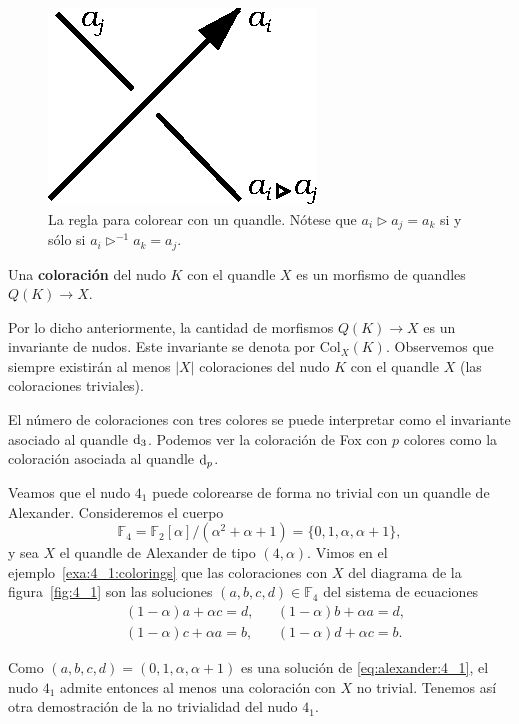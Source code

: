 \documentclass[graybox]{svmult}
\newcommand{\F}{\mathbb{F}}
\begin{document}
    \begin{figure}[h]
		\centering
	    \includegraphics[scale=0.6]{images/quandlecrossing}
		\caption{La regla para colorear con un quandle. Nótese que $a_i\triangleright a_j=a_k$ si y sólo si $a_i\triangleright^{-1}a_k=a_j$.}
        \label{fig:quandle_crossing}
    \end{figure}

	\begin{definition}
		Una \textbf{coloración} del nudo $K$ con el quandle $X$ es un morfismo
		de quandles $Q(K)\to X$. 
	\end{definition}

	Por lo dicho anteriormente, la cantidad de
    morfismos $Q(K)\to X$ es un invariante de nudos.  Este invariante se denota
    por $\mathrm{Col}_X(K)$.  Observemos que siempre existirán al menos $|X|$
    coloraciones del nudo $K$ con el quandle $X$ (las coloraciones triviales).

\begin{example}
    El número de coloraciones con tres colores se puede interpretar como 
    el invariante asociado al
    quandle $\mathrm{d}_3$. Podemos ver la coloración de Fox con $p$ colores 
    como la coloración asociada al quandle $\mathrm{d}_p$. 
\end{example}

\begin{example}
    \label{exa:T}
    Veamos que el nudo $4_1$ puede colorearse de forma no trivial con un
    quandle de Alexander.  Consideremos el cuerpo
    \[
        \F_4=\F_2[\alpha]/(\alpha^2+\alpha+1)=\{0,1,\alpha,\alpha+1\},
    \]
    y sea $X$ el quandle de Alexander de tipo $(4,\alpha)$. Vimos en el
    ejemplo~\ref{exa:4_1:colorings} que las coloraciones con $X$ del diagrama de la
    figura~\ref{fig:4_1} son las soluciones $(a,b,c,d)\in\F_4$ del sistema de
    ecuaciones 
    \begin{equation}
        \label{eq:alexander:4_1}
        \begin{aligned}
            & (1-\alpha)a+\alpha c=d, && (1-\alpha)b+\alpha a=d,\\
            & (1-\alpha)c+\alpha a=b, && (1-\alpha)d+\alpha c=b.
        \end{aligned}
    \end{equation}

    Como $(a,b,c,d)=(0,1,\alpha,\alpha+1)$ es una solución de
    \eqref{eq:alexander:4_1}, el nudo $4_1$ admite entonces al menos una coloración 
    con $X$ no trivial.  Tenemos así otra demostración de la no trivialidad del
    nudo $4_1$. 
\end{example}
\end{document}
